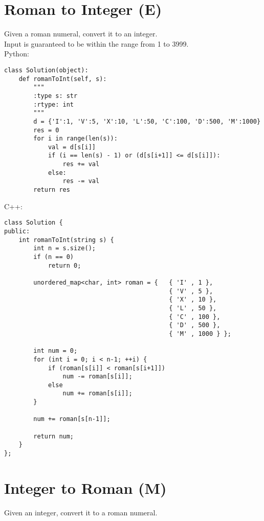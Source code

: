 \section{Roman to Integer (E)}
Given a roman numeral, convert it to an integer.\\

Input is guaranteed to be within the range from 1 to 3999.\\

Python:
\lstset{language=python}
\begin{lstlisting}
class Solution(object):
    def romanToInt(self, s):
        """
        :type s: str
        :rtype: int
        """
        d = {'I':1, 'V':5, 'X':10, 'L':50, 'C':100, 'D':500, 'M':1000}
        res = 0
        for i in range(len(s)):
            val = d[s[i]]
            if (i == len(s) - 1) or (d[s[i+1]] <= d[s[i]]):
                res += val
            else:
                res -= val
        return res
\end{lstlisting}   
        
C++:
\lstset{language=c++}
\begin{lstlisting}
class Solution {
public:
    int romanToInt(string s) {
        int n = s.size();
        if (n == 0)
            return 0;

        unordered_map<char, int> roman = {   { 'I' , 1 },
                                             { 'V' , 5 },
                                             { 'X' , 10 },
                                             { 'L' , 50 },
                                             { 'C' , 100 },
                                             { 'D' , 500 },
                                             { 'M' , 1000 } };
                                         
        int num = 0;
        for (int i = 0; i < n-1; ++i) {
            if (roman[s[i]] < roman[s[i+1]])
                num -= roman[s[i]];
            else
                num += roman[s[i]];
        }
    
        num += roman[s[n-1]];
    
        return num;
    }
};
\end{lstlisting}   


\section{Integer to Roman (M)}
Given an integer, convert it to a roman numeral. \\

